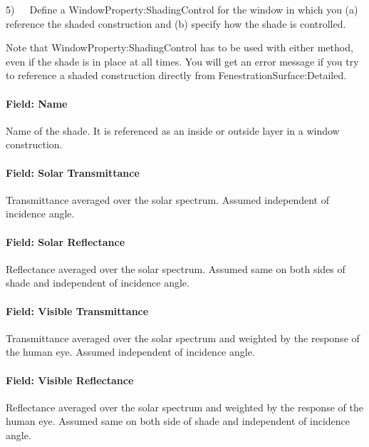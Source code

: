 5)~~~Define a WindowProperty:ShadingControl for the window in which you (a) reference the shaded construction and (b) specify how the shade is controlled.

Note that WindowProperty:ShadingControl has to be used with either method, even if the shade is in place at all times. You will get an error message if you try to reference a shaded construction directly from FenestrationSurface:Detailed.

\paragraph{Field: Name}\label{field-name-16-009}

Name of the shade. It is referenced as an inside or outside layer in a window construction.

\paragraph{Field: Solar Transmittance}\label{field-solar-transmittance}

Transmittance averaged over the solar spectrum. Assumed independent of incidence angle.

\paragraph{Field: Solar Reflectance}\label{field-solar-reflectance}

Reflectance averaged over the solar spectrum. Assumed same on both sides of shade and independent of incidence angle.

\paragraph{Field: Visible Transmittance}\label{field-visible-transmittance-1}

Transmittance averaged over the solar spectrum and weighted by the response of the human eye. Assumed independent of incidence angle.

\paragraph{Field: Visible Reflectance}\label{field-visible-reflectance}

Reflectance averaged over the solar spectrum and weighted by the response of the human eye. Assumed same on both side of shade and independent of incidence angle.

